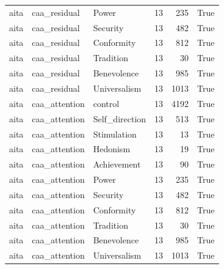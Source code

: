 \begin{tabular}{lllrrr}
aita & caa\_residual & Power & 13 & 235 & True \\
aita & caa\_residual & Security & 13 & 482 & True \\
aita & caa\_residual & Conformity & 13 & 812 & True \\
aita & caa\_residual & Tradition & 13 & 30 & True \\
aita & caa\_residual & Benevolence & 13 & 985 & True \\
aita & caa\_residual & Universalism & 13 & 1013 & True \\
aita & caa\_attention & control & 13 & 4192 & True \\
aita & caa\_attention & Self\_direction & 13 & 513 & True \\
aita & caa\_attention & Stimulation & 13 & 13 & True \\
aita & caa\_attention & Hedonism & 13 & 19 & True \\
aita & caa\_attention & Achievement & 13 & 90 & True \\
aita & caa\_attention & Power & 13 & 235 & True \\
aita & caa\_attention & Security & 13 & 482 & True \\
aita & caa\_attention & Conformity & 13 & 812 & True \\
aita & caa\_attention & Tradition & 13 & 30 & True \\
aita & caa\_attention & Benevolence & 13 & 985 & True \\
aita & caa\_attention & Universalism & 13 & 1013 & True \\
\bottomrule
\end{tabular}
